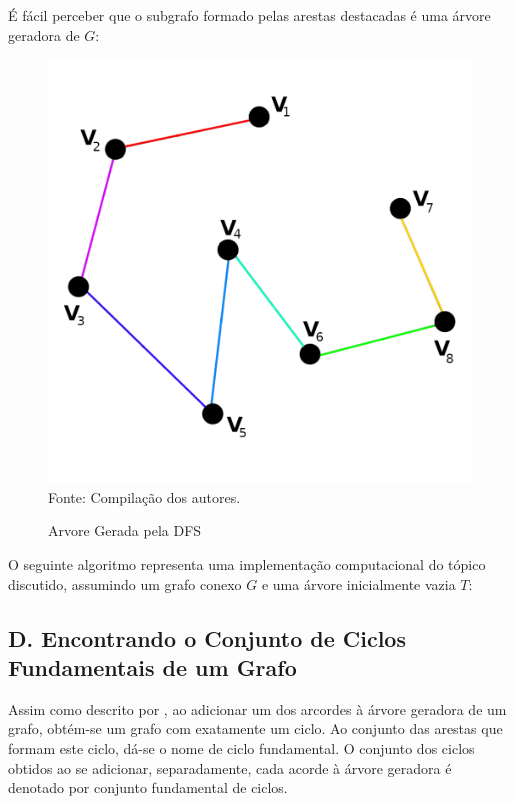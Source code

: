 \documentclass[twocolumn, 10pt,a4paper]{extarticle}
\begin{document}
É fácil perceber que o subgrafo formado pelas arestas destacadas é uma árvore geradora de $G$:

\begin{figure}[H]
	\caption{Arvore Gerada pela DFS} 
	\centering
	\includegraphics[scale=0.6]{spanning2}
	\\ Fonte: Compilação dos autores.
\end{figure}

O seguinte algoritmo representa uma implementação computacional do tópico discutido, assumindo um grafo conexo $G$ e uma árvore inicialmente vazia $T$:

\begingroup
{}\label{st}
\begin{algorithmic}[1]
	\EndFor
\EndFunction
\end{algorithmic}
\hrulefill
\endgroup

\subsection*{D. \quad Encontrando o Conjunto de Ciclos Fundamentais de um Grafo}
Assim como descrito por \cite{krishna}, ao adicionar um dos arcordes à árvore geradora de um grafo, obtém-se um grafo com exatamente um ciclo. Ao conjunto das arestas que formam este ciclo, dá-se o nome de ciclo fundamental. O conjunto dos ciclos obtidos ao se adicionar, separadamente, cada acorde à árvore geradora é denotado por conjunto fundamental de ciclos. 
\end{document}
